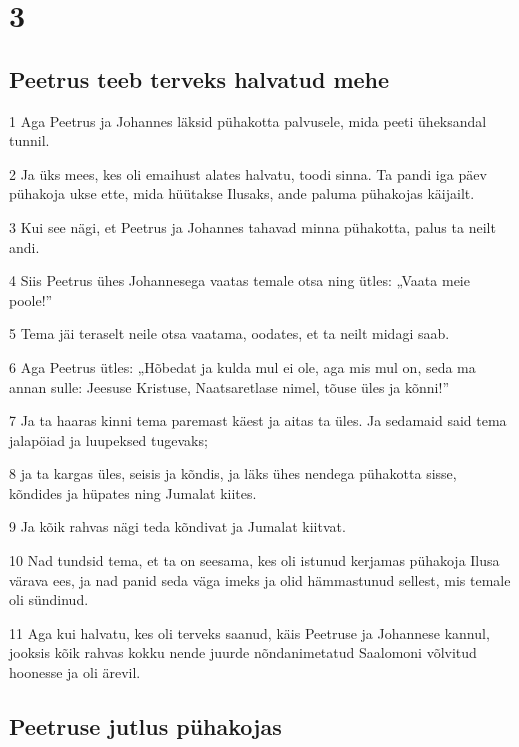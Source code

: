 \chapter{3}

\section*{Peetrus teeb terveks halvatud mehe}

\par 1 Aga Peetrus ja Johannes läksid pühakotta palvusele, mida peeti üheksandal tunnil.
\par 2 Ja üks mees, kes oli emaihust alates halvatu, toodi sinna. Ta pandi iga päev pühakoja ukse ette, mida hüütakse Ilusaks, ande paluma pühakojas käijailt.
\par 3 Kui see nägi, et Peetrus ja Johannes tahavad minna pühakotta, palus ta neilt andi.
\par 4 Siis Peetrus ühes Johannesega vaatas temale otsa ning ütles: „Vaata meie poole!”
\par 5 Tema jäi teraselt neile otsa vaatama, oodates, et ta neilt midagi saab.
\par 6 Aga Peetrus ütles: „Hõbedat ja kulda mul ei ole, aga mis mul on, seda ma annan sulle: Jeesuse Kristuse, Naatsaretlase nimel, tõuse üles ja kõnni!”
\par 7 Ja ta haaras kinni tema paremast käest ja aitas ta üles. Ja sedamaid said tema jalapöiad ja luupeksed tugevaks;
\par 8 ja ta kargas üles, seisis ja kõndis, ja läks ühes nendega pühakotta sisse, kõndides ja hüpates ning Jumalat kiites.
\par 9 Ja kõik rahvas nägi teda kõndivat ja Jumalat kiitvat.
\par 10 Nad tundsid tema, et ta on seesama, kes oli istunud kerjamas pühakoja Ilusa värava ees, ja nad panid seda väga imeks ja olid hämmastunud sellest, mis temale oli sündinud.
\par 11 Aga kui halvatu, kes oli terveks saanud, käis Peetruse ja Johannese kannul, jooksis kõik rahvas kokku nende juurde nõndanimetatud Saalomoni võlvitud hoonesse ja oli ärevil.

\section*{Peetruse jutlus pühakojas}


